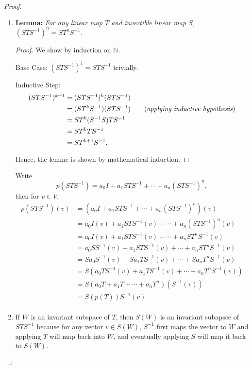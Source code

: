 \documentclass{article}
\newcommand*{\N}{\ensuremath{\mathbb{N}}}
\begin{document}
\begin{proof}\indent 
    \begin{enumerate}[label=(\alph*)]
        \item
        \textbf{Lemma:} \emph{For any linear map $T$ and invertible linear map $S$, $(STS^{-1})^n = 
        ST^nS^{-1}$.} 
        \begin{proof}
            We show by induction on $\N$.
            
            Base Case: $(STS^{-1})^1 = STS^{-1}$ trivially.

            Inductive Step:
            \begin{align*}
                (STS^{-1})^{k+1} & = (STS^{-1})^k(STS^{-1}) \\
                & = (ST^kS^{-1})(STS^{-1}) \qquad (\emph{applying inductive hypothesis})\\
                & = ST^k(S^{-1}S)TS^{-1} \\
                & = ST^kTS^{-1} \\
                & = ST^{k+1}S^{-1}.
            \end{align*}

            Hence, the lemme is shown by mathematical induction.
        \end{proof}


        Write $$p(STS^{-1}) = a_0I + a_1STS^{-1} + \cdots + a_n(STS^{-1})^n,$$ then 
        for $v\in V$,
        \begin{align*}
            p(STS^{-1})(v) & = (a_0I + a_1STS^{-1} + \cdots + a_n(STS^{-1})^n)(v) \\
            & = a_0I(v) + a_1STS^{-1}(v) + \cdots + a_n(STS^{-1})^n(v) \\
            & = a_0I(v) + a_1STS^{-1}(v) + \cdots + a_nST^nS^{-1}(v) \\
            & = a_0SS^{-1}(v) + a_1STS^{-1}(v) + \cdots + a_nST^nS^{-1}(v) \\
            & = Sa_0S^{-1}(v) + Sa_1TS^{-1}(v) + \cdots + Sa_nT^nS^{-1}(v) \\
            & = S(a_0TS^{-1}(v) + a_1TS^{-1}(v) + \cdots + a_nT^nS^{-1}(v)) \\
            & = S(a_0T + a_1T + \cdots + a_nT^n)\left(S^{-1}(v)\right) \\
            & = S(p(T))S^{-1}(v) \\
        \end{align*}

        \item 
        If $W$ is an invariant subspace of $T$, then $S(W)$ is an invariant subapsce of 
        $STS^{-1}$ because for any vector $v\in S(W)$, $S^{-1}$ first maps the vector to $W$ and applying $T$ will map back into 
        $W$, and eventually applying $S$ will map it back to $S(W)$.
    \end{enumerate}
\end{proof}
\end{document}
